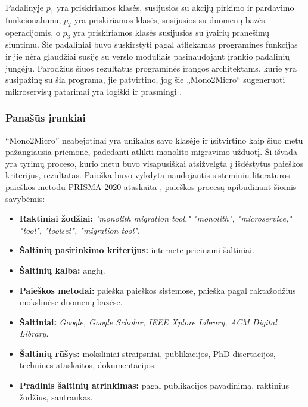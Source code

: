 \documentclass{VUMIFPSbakalaurinis}
\begin{document}
Padalinyje $p_{1}$ yra priskiriamos klasės, susijusios su akcijų pirkimo ir pardavimo funkcionalumu, $p_{2}$ yra priskiriamos klasės, susijusios su duomenų bazės operacijomis, o $p_{3}$ yra priskiriamos klasės susijusios su įvairių pranešimų siuntimu. Šie padaliniai buvo suskirstyti pagal atliekamas programines funkcijas ir jie nėra glaudžiai susiję su verslo moduliais pasinaudojant įrankio padalinių jungėju. Parodžius šiuos rezultatus programinės įrangos architektams, kurie yra susipažinę su šia programa, jie patvirtino, jog šie „Mono2Micro“ sugeneruoti mikroservisų patarimai yra logiški ir prasmingi \cite{KXL+20}.

\subsubsection{Panašūs įrankiai}
\enquote{Mono2Micro} neabejotinai yra unikalus savo klasėje ir įsitvirtino kaip šiuo metu pažangiausia priemonė, padedanti atlikti monolito migravimo užduotį. Ši išvada yra tyrimų proceso, kurio metu buvo visapusiškai atsižvelgta į išdėstytus paieškos kriterijus, rezultatas. Paieška buvo vykdyta naudojantis sisteminiu literatūros paieškos metodu PRISMA 2020 ataskaita \cite{Moherb2535}, paieškos procesą apibūdinant šiomis savybėmis:

\begin{itemize}

    \item \textbf{Raktiniai žodžiai:} \emph{"monolith migration tool," "monolith", "microservice," "tool", "toolset", "migration tool"}.

    \item \textbf{Šaltinių pasirinkimo kriterijus:} internete prieinami šaltiniai.

    \item \textbf{Šaltinių kalba:} anglų.

    \item \textbf{Paieškos metodai:} paieška paieškos sistemose, paieška pagal raktažodžius mokslinėse duomenų bazėse.

    \item \textbf{Šaltiniai:} \emph{Google, Google Scholar, IEEE Xplore Library, ACM Digital Library}.

    \item \textbf{Šaltinių rūšys:} moksliniai straipsniai, publikacijos, PhD disertacijos, techninės ataskaitos, dokumentacijos.

    \item \textbf{Pradinis šaltinių atrinkimas:} pagal publikacijos pavadinimą, raktinius žodžius, santraukas.
    
\end{itemize}
\end{document}
